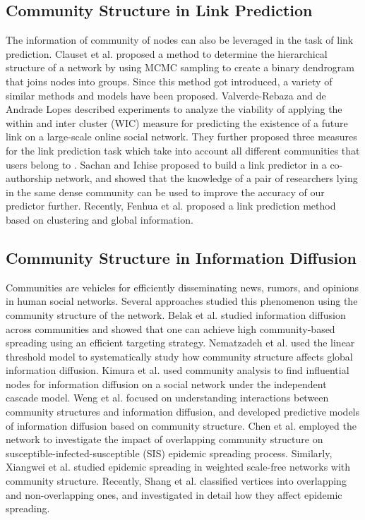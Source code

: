 \subsection{Community Structure in Link Prediction}
The information of community of nodes can also be leveraged in the task of link prediction. Clauset et al. \cite{Clauset.Moore} proposed a
method to determine the hierarchical structure of a network by using MCMC sampling to create a binary dendrogram that joins nodes into
groups. Since this method got introduced, a variety of similar methods and models have been proposed. Valverde-Rebaza and de Andrade
Lopes \cite{6412391} described experiments to analyze the viability of applying the within and inter cluster (WIC) measure for predicting
the existence of a future link on a large-scale online social network. They further proposed three measures for the link prediction task
which take into account all different communities that users belong to \cite{Valverde-RebazaICSA2014}. Sachan and Ichise \cite{5460690}
proposed to build a link predictor in a co-authorship network, and showed that the knowledge of a pair of researchers lying in the same
dense community can be used to improve the accuracy of our predictor further. Recently, Fenhua et al. \cite{Li2014432} proposed a link
prediction method based on clustering and global information.

\subsection{Community Structure in Information Diffusion}
Communities are vehicles for efficiently disseminating news, rumors, and opinions in human social networks. Several approaches studied this
phenomenon using the community structure of the network. Belak et al. \cite{6425767} studied information diffusion across communities and
showed that one can achieve high community-based spreading using an efficient targeting strategy. Nematzadeh et al. \cite{Nematzadeh}
used
the linear threshold model to systematically study how community structure affects global information diffusion. Kimura et al.
\cite{KimuraYSM08} used community analysis to find  influential nodes for information diffusion on a social network under the independent
cascade model. Weng et al. \cite{Weng13} focused on understanding interactions between community structures and information diffusion, and
developed predictive models of information diffusion based on community structure. Chen et al. \cite{Chen20121848} employed the network to
investigate the impact of overlapping community structure on susceptible-infected-susceptible (SIS) epidemic spreading process. Similarly,
Xiangwei et al. \cite{Xiangwei}  studied epidemic spreading in weighted scale-free networks with community structure. Recently, Shang et
al. \cite{Shang6903136} classified vertices into overlapping and non-overlapping ones, and investigated in detail how they affect epidemic
spreading.

